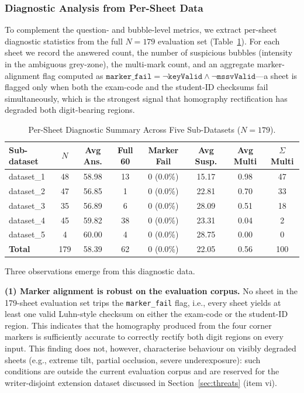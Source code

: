 \documentclass[conference]{IEEEtran}
\begin{document}
\subsubsection{Diagnostic Analysis from Per-Sheet Data}

To complement the question- and bubble-level metrics, we extract
per-sheet diagnostic statistics from the full $N{=}179$ evaluation set
(Table~\ref{tab:diag}).
For each sheet we record the answered count, the number of suspicious
bubbles (intensity in the ambiguous grey-zone), the multi-mark count,
and an aggregate marker-alignment flag computed as
\mbox{$\texttt{marker\_fail}=\neg\texttt{keyValid}\land\neg\texttt{mssvValid}$}---a
sheet is flagged only when both the exam-code and the student-ID
checksums fail simultaneously, which is the strongest signal that
homography rectification has degraded both digit-bearing regions.

\begin{table}[t]
\caption{Per-Sheet Diagnostic Summary Across Five Sub-Datasets ($N{=}179$).}
\label{tab:diag}
\centering
\setlength{\tabcolsep}{3pt}
\begin{tabular}{lccccccc}
\toprule
\textbf{Sub-dataset} & \textbf{$N$} & \textbf{Avg Ans.}
  & \textbf{Full 60} & \textbf{Marker Fail}
  & \textbf{Avg Susp.} & \textbf{Avg Multi} & \textbf{$\Sigma$Multi} \\
\midrule
dataset\_1 & 48  & 58.98 & 13 & 0 (0.0\%) & 15.17 & 0.98 & 47 \\
dataset\_2 & 47  & 56.85 & 1  & 0 (0.0\%) & 22.81 & 0.70 & 33 \\
dataset\_3 & 35  & 56.89 & 6  & 0 (0.0\%) & 28.09 & 0.51 & 18 \\
dataset\_4 & 45  & 59.82 & 38 & 0 (0.0\%) & 23.31 & 0.04 & 2  \\
dataset\_5 & 4   & 60.00 & 4  & 0 (0.0\%) & 28.75 & 0.00 & 0  \\
\midrule
\textbf{Total} & 179 & 58.39 & 62 & 0 (0.0\%) & 22.05 & 0.56 & 100 \\
\bottomrule
\end{tabular}
\end{table}

Three observations emerge from this diagnostic data.

\textbf{(1) Marker alignment is robust on the evaluation corpus.}
No sheet in the 179-sheet evaluation set trips the
\texttt{marker\_fail} flag, i.e., every sheet yields at least one
valid Luhn-style checksum on either the exam-code or the student-ID
region.
This indicates that the homography produced from the four corner
markers is sufficiently accurate to correctly rectify both digit
regions on every input.
This finding does not, however, characterise behaviour on visibly
degraded sheets (e.g., extreme tilt, partial occlusion, severe
underexposure): such conditions are outside the current evaluation
corpus and are reserved for the writer-disjoint extension dataset
discussed in Section~\ref{sec:threats} (item vi).
\end{document}
